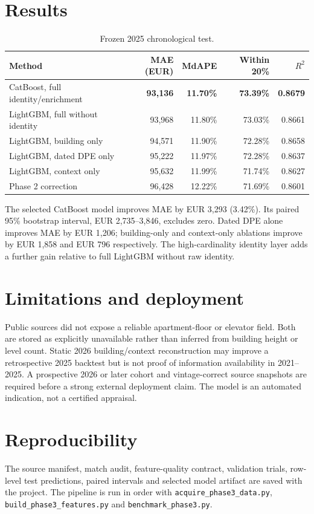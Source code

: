 \documentclass[11pt,a4paper]{article}
\begin{document}
\section{Results}
\begin{table}[htbp]
\centering
\caption{Frozen 2025 chronological test.}
\begin{tabular}{lrrrr}
\toprule
Method & MAE (EUR) & MdAPE & Within 20\% & $R^2$ \\
\midrule
CatBoost, full identity/enrichment & \textbf{93,136} & \textbf{11.70\%} & \textbf{73.39\%} & \textbf{0.8679} \\
LightGBM, full without identity & 93,968 & 11.80\% & 73.03\% & 0.8661 \\
LightGBM, building only & 94,571 & 11.90\% & 72.28\% & 0.8658 \\
LightGBM, dated DPE only & 95,222 & 11.97\% & 72.28\% & 0.8637 \\
LightGBM, context only & 95,632 & 11.99\% & 71.74\% & 0.8627 \\
Phase 2 correction & 96,428 & 12.22\% & 71.69\% & 0.8601 \\
\bottomrule
\end{tabular}
\end{table}

The selected CatBoost model improves MAE by EUR 3,293 (3.42\%). Its paired
95\% bootstrap interval, EUR 2,735--3,846, excludes zero. Dated DPE alone
improves MAE by EUR 1,206; building-only and context-only ablations improve by
EUR 1,858 and EUR 796 respectively. The high-cardinality identity layer adds a
further gain relative to full LightGBM without raw identity.

\section{Limitations and deployment}
Public sources did not expose a reliable apartment-floor or elevator field.
Both are stored as explicitly unavailable rather than inferred from building
height or level count. Static 2026 building/context reconstruction may improve
a retrospective 2025 backtest but is not proof of information availability in
2021--2025. A prospective 2026 or later cohort and vintage-correct source
snapshots are required before a strong external deployment claim. The model is
an automated indication, not a certified appraisal.

\section{Reproducibility}
The source manifest, match audit, feature-quality contract, validation trials,
row-level test predictions, paired intervals and selected model artifact are
saved with the project. The pipeline is run in order with
\texttt{acquire\_phase3\_data.py}, \texttt{build\_phase3\_features.py} and
\texttt{benchmark\_phase3.py}.
\end{document}
